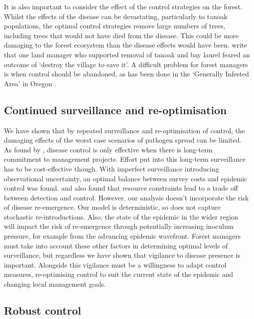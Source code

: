 It is also important to consider the effect of the control strategies on the forest. Whilst the effects of the disease can be devastating, particularly to tanoak populations, the optimal control strategies remove large numbers of trees, including trees that would not have died from the disease. This could be more damaging to the forest ecosystem than the disease effects would have been. \citet{alexander_lessons_2010} write that one land manager who supported removal of tanoak and bay laurel feared an outcome of `destroy the village to save it'. A difficult problem for forest managers is when control should be abandoned, as has been done in the `Generally Infested Area' in Oregon \citep{hansen_efficacy_2019}.

\subsection{Continued surveillance and re-optimisation}

We have shown that by repeated surveillance and re-optimisation of control, the damaging effects of the worst case scenarios of pathogen spread can be limited. As found by \citet{cobb_resiliency_2017}, disease control is only effective when there is long-term commitment to management projects. Effort put into this long-term surveillance has to be cost-effective though. With imperfect surveillance introducing observational uncertainty, an optimal balance between survey costs and epidemic control was found. \citet{ndeffo_mbah_balancing_2010} and \citet[Supporting Information]{cunniffe_modelling_2016} also found that resource constraints lead to a trade off between detection and control. However, our analysis doesn't incorporate the risk of disease re-emergence. Our model is deterministic, so does not capture stochastic re-introductions. Also, the state of the epidemic in the wider region will impact the risk of re-emergence through potentially increasing inoculum pressure, for example from the advancing epidemic wavefront. Forest managers must take into account these other factors in determining optimal levels of surveillance, but regardless we have shown that vigilance to disease presence is important. Alongside this vigilance must be a willingness to adapt control measures, re-optimising control to suit the current state of the epidemic and changing local management goals.

\subsection{Robust control}

